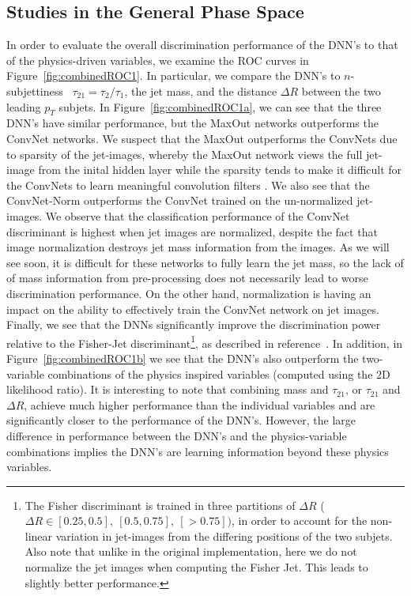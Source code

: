 
\subsection{Studies in the General Phase Space} %
\label{sub:coarse_studies}

In order to evaluate the overall discrimination performance of the DNN's to that of the physics-driven variables, we examine the ROC curves in Figure~\ref{fig:combinedROC1}. In particular, we compare the DNN's to $n$-subjettiness~\cite{nsub} $\tau_{21} = \tau_{2}/\tau_{1}$, the jet mass, and the distance $\Delta R$ between the two leading $p_{T}$ subjets.  In Figure~\ref{fig:combinedROC1a}, we can see that the three DNN's have similar performance, but the MaxOut networks outperforms the ConvNet networks.  We suspect that the MaxOut outperforms the ConvNets due to sparsity of the jet-images, whereby the MaxOut network views the full jet-image from the inital hidden layer while the sparsity tends to make it difficult for the ConvNets to learn meaningful convolution filters .  We also see that the ConvNet-Norm outperforms the ConvNet trained on the un-normalized jet-images.  We observe that the classification performance of the ConvNet discriminant is highest when jet images are normalized, despite the fact that image normalization destroys jet mass information from the images. As we will see soon, it is difficult for these networks to fully learn the jet mass, so the lack of of mass information from pre-processing does not necessarily lead to worse discrimination performance. On the other hand, normalization is having an impact on the ability to effectively train the ConvNet network on jet images.  Finally, we see that the DNNs significantly improve the discrimination power relative to the Fisher-Jet discriminant\footnote{The Fisher discriminant is trained in three partitions of $\Delta  R$ ($\Delta R \in [0.25, 0.5],\ [0.5, 0.75],\ [>0.75])$, in order to account for the non-linear variation in jet-images from the differing positions of the two subjets.  Also note that unlike in the original implementation, here we do not normalize the jet images when computing the Fisher Jet.  This leads to slightly better performance.}, as described in reference~\cite{Cogan:2014oua}. In addition, in Figure~\ref{fig:combinedROC1b} we see that the DNN's also outperform the two-variable combinations of the physics inspired variables (computed using the 2D likelihood ratio).   It is interesting to note that combining mass and $\tau_{21}$, or $\tau_{21}$ and $\Delta R$, achieve much higher performance than the individual variables and are significantly closer to the performance of the DNN's.  However, the large difference in performance between the DNN's and the physics-variable combinations implies the DNN's are learning information beyond these physics variables.

